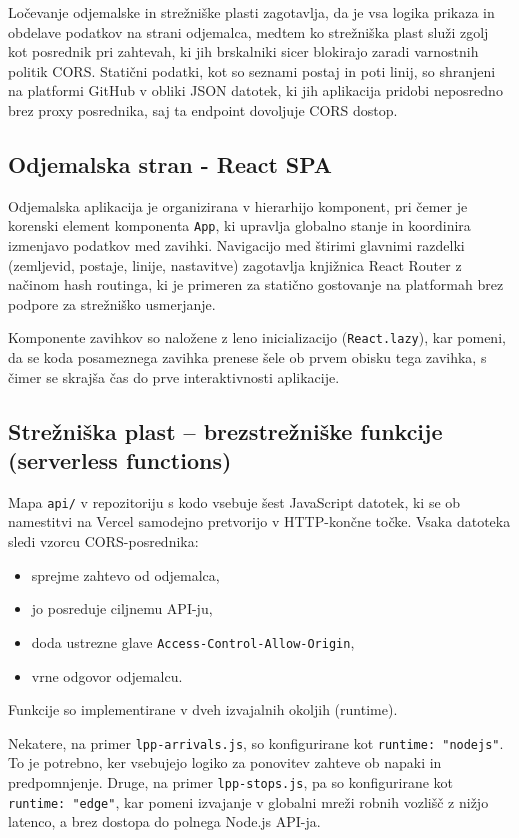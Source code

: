 \documentclass[12pt]{article}
\begin{document}
Ločevanje odjemalske in strežniške plasti zagotavlja, da je vsa logika prikaza in obdelave podatkov na strani odjemalca, medtem ko strežniška plast služi zgolj kot posrednik pri zahtevah, ki jih brskalniki sicer blokirajo zaradi varnostnih politik CORS. Statični podatki, kot so seznami postaj in poti linij, so shranjeni na platformi GitHub v obliki JSON datotek, ki jih aplikacija pridobi neposredno brez proxy posrednika, saj ta endpoint dovoljuje CORS dostop.

\subsection{Odjemalska stran - React SPA}

Odjemalska aplikacija je organizirana v hierarhijo komponent, pri čemer je korenski element komponenta \texttt{App}, ki upravlja globalno stanje in koordinira izmenjavo podatkov med zavihki. Navigacijo med štirimi glavnimi razdelki (zemljevid, postaje, linije, nastavitve) zagotavlja knjižnica React Router z načinom hash routinga, ki je primeren za statično gostovanje na platformah brez podpore za strežniško usmerjanje.

Komponente zavihkov so naložene z leno inicializacijo (\texttt{React.lazy}), kar pomeni, da se koda posameznega zavihka prenese šele ob prvem obisku tega zavihka, s čimer se skrajša čas do prve interaktivnosti aplikacije.

\subsection{Strežniška plast -- brezstrežniške funkcije (serverless functions)}

Mapa \texttt{api/} v repozitoriju s kodo vsebuje šest JavaScript datotek, ki se ob namestitvi na Vercel samodejno pretvorijo v HTTP-končne točke. Vsaka datoteka sledi vzorcu CORS-posrednika:
\begin{itemize}[noitemsep]
\item sprejme zahtevo od odjemalca,
\item jo posreduje ciljnemu API-ju,
\item doda ustrezne glave \texttt{Access-Control-Allow-Origin},
\item vrne odgovor odjemalcu.
\end{itemize}

Funkcije so implementirane v dveh izvajalnih okoljih (runtime).

Nekatere, na primer \texttt{lpp-arrivals.js}, so konfigurirane kot \texttt{runtime: "nodejs"}. To je potrebno, ker vsebujejo logiko za ponovitev zahteve ob napaki in predpomnjenje. Druge, na primer \texttt{lpp-stops.js}, pa so konfigurirane kot \texttt{runtime: "edge"}, kar pomeni izvajanje v globalni mreži robnih vozlišč z nižjo latenco, a brez dostopa do polnega Node.js API-ja.
\end{document}
